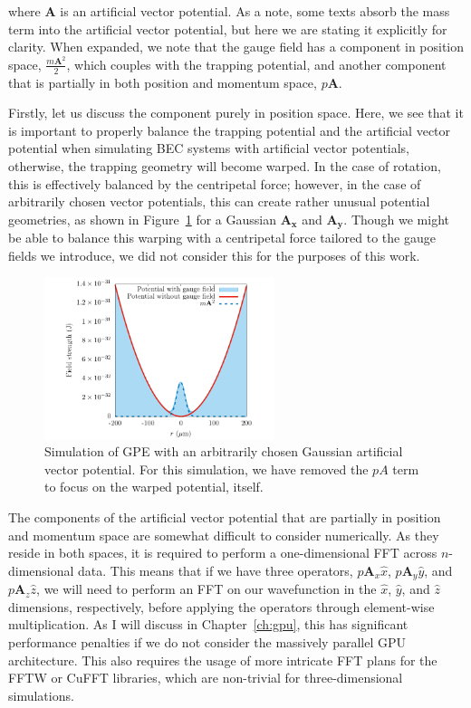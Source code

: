 \noindent where $\mathbf{A}$ is an artificial vector potential.
As a note, some texts absorb the mass term into the artificial vector potential, but here we are stating it explicitly for clarity.
When expanded, we note that the gauge field has a component in position space, $\frac{m\mathbf{A}^2}{2}$, which couples with the trapping potential, and another component that is partially in both position and momentum space, $p\mathbf{A}$.

Firstly, let us discuss the component purely in position space.
Here, we see that it is important to properly balance the trapping potential and the artificial vector potential when simulating BEC systems with artificial vector potentials, otherwise, the trapping geometry will become warped.
In the case of rotation, this is effectively balanced by the centripetal force; however, 
in the case of arbitrarily chosen vector potentials, this can create rather unusual potential geometries, as shown in Figure~\ref{fig:V_change} for a Gaussian $\mathbf{A_x}$ and $\mathbf{A_y}$.
Though we might be able to balance this warping with a centripetal force tailored to the gauge fields we introduce, we did not consider this for the purposes of this work.

\begin{figure}

\center \includegraphics[width=0.6\textwidth]{data/splitop/gauge/check.pdf}

\caption{
Simulation of GPE with an arbitrarily chosen Gaussian artificial vector potential.
For this simulation, we have removed the $pA$ term to focus on the warped potential, itself.}
\label{fig:V_change}
\end{figure}

The components of the artificial vector potential that are partially in position and momentum space are somewhat difficult to consider numerically.
As they reside in both spaces, it is required to perform a one-dimensional FFT across $n$-dimensional data.
This means that if we have three operators, $p\mathbf{A}_x \hat x$, $p\mathbf{A}_y \hat y$, and $p\mathbf{A}_z \hat z$, we will need to perform an FFT on our wavefunction in the $\hat x$, $\hat y$, and $\hat z$ dimensions, respectively, before applying the operators through element-wise multiplication. 
As I will discuss in Chapter~\ref{ch:gpu}, this has significant performance penalties if we do not consider the massively parallel GPU architecture.
This also requires the usage of more intricate FFT plans for the FFTW or CuFFT libraries, which are non-trivial for three-dimensional simulations.

